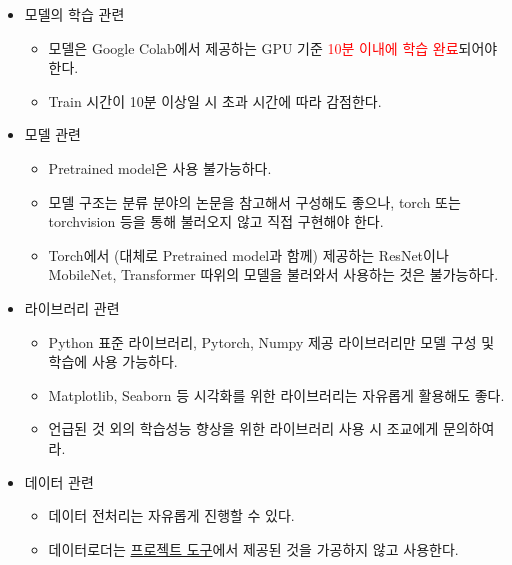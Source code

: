     \begin{itemize}\tightlist
            \item 모델의 학습 관련
            \begin{itemize}\tightlist
                \item 모델은 Google Colab에서 제공하는 GPU 기준 \textcolor{red}{10분 이내에 학습 완료}되어야 한다.
                \item Train 시간이 10분 이상일 시 초과 시간에 따라 감점한다.
            \end{itemize}
        \item 모델 관련
            \begin{itemize}\tightlist
                \color{red}
                \item Pretrained model은 사용 불가능하다.
                \item 모델 구조는 분류 분야의 논문을 참고해서 구성해도 좋으나, torch 또는 torchvision 등을 통해 불러오지 않고 직접 구현해야 한다. 
                \item Torch에서 (대체로 Pretrained model과 함께) 제공하는 ResNet이나 MobileNet, Transformer 따위의 모델을 불러와서 사용하는 것은 불가능하다.
            \end{itemize}
        \item 라이브러리 관련
            \begin{itemize}\tightlist
                \item Python 표준 라이브러리, Pytorch, Numpy 제공 라이브러리만 모델 구성 및 학습에 사용 가능하다.
                \item Matplotlib, Seaborn 등 시각화를 위한 라이브러리는 자유롭게 활용해도 좋다.
                \item 언급된 것 외의 학습성능 향상을 위한 라이브러리 사용 시 조교에게 문의하여라.
            \end{itemize}
        \item 데이터 관련
            \begin{itemize}\tightlist
                \item 데이터 전처리는 자유롭게 진행할 수 있다.
                \item 데이터로더는 \href{https://github.com/jaehyun-ko/EEE4178-Project-2022/blob/main/src/Project_2022_utils.ipynb}{프로젝트 도구}에서 제공된 것을 가공하지 않고 사용한다.
            \end{itemize}
    \end{itemize}
